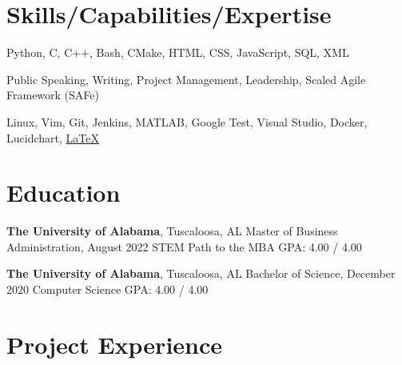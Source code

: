 \documentclass[hidelinks, 11pt]{article}
\begin{document}
\makecvtitle
\vspace{0.5mm}

\section{Skills/Capabilities/Expertise}

\begin{description}[widest=Programming Langauges:]
  \item[Programming Languages:]	Python, C, C++, Bash, CMake, HTML, CSS, JavaScript, SQL, XML
  \item[Soft Skills:]	Public Speaking, Writing, Project Management, Leadership, Scaled Agile Framework (SAFe)
  \item[Tools:]	Linux, Vim, Git, Jenkins, MATLAB, Google Test, Visual Studio, Docker, Lucidchart, \color{blue}\href{https://github.com/chwerth/LaTeX_Resume}{LaTeX}
\end{description}

\section{Education}
\vspace{-1.4mm}
\begin{multicols}{2}

  \begin{minipage}{0.5\textwidth}
    \textbf{The University of Alabama}, Tuscaloosa, AL \newline
    Master of Business Administration, August 2022 \newline
    STEM Path to the MBA \newline
    GPA: 4.00 / 4.00
  \end{minipage}

  \begin{minipage}{0.5\textwidth}
    \textbf{The University of Alabama}, Tuscaloosa, AL \newline
    Bachelor of Science, December 2020 \newline
    Computer Science \newline
    GPA: 4.00 / 4.00
  \end{minipage}

\end{multicols}

\vspace{-1.4mm}
\section{Project Experience}
\end{document}
